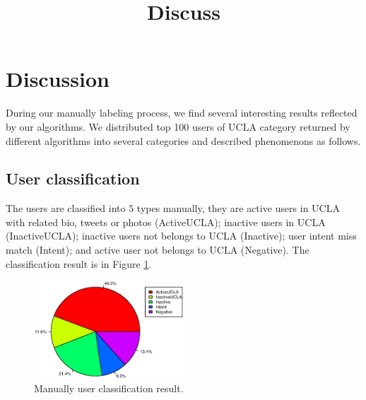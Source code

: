 \documentclass{article}
\begin{document}
\title{Discuss}
\maketitle \else \fi



\section{Discussion}\label{sec:discussion}
During our manually labeling process, we find several interesting results reflected by our algorithms. We distributed top 100 users of UCLA category returned by different algorithms into several categories and described phenomenons as follows.

\subsection{User classification}
The users are classified into $5$ types manually, they are active users in UCLA with related bio, tweets or photos (ActiveUCLA); inactive users in UCLA (InactiveUCLA); inactive users not belongs to UCLA (Inactive); user intent miss match (Intent); and active user not belongs to UCLA (Negative). The classification result is in Figure \ref{fig:userclass}.

\begin{figure}[h]
\centering
\includegraphics[width=0.5\textwidth]{experiment/uc.eps}
\caption{Manually user classification result.}
\label{fig:userclass}
\end{figure}
\end{document}
